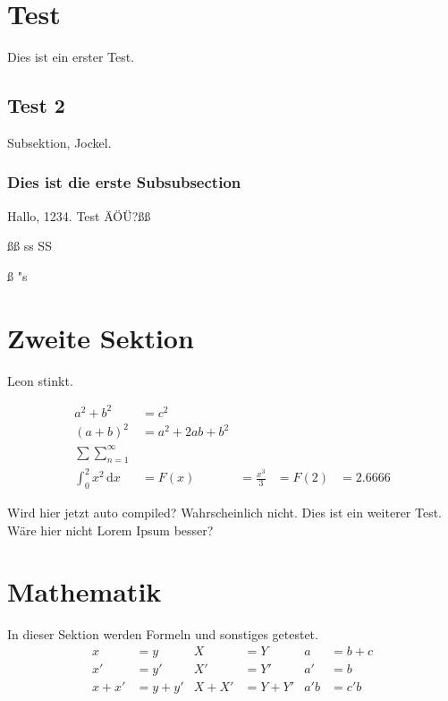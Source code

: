 \section{Test}
Dies ist ein erster Test.

\subsection{Test 2}
Subsektion, Jockel.

\subsubsection{Dies ist die erste Subsubsection}

Hallo, 1234. Test ÄÖÜ?ßß

ßß ss SS

ß
"s
\section{Zweite Sektion}
Leon stinkt.

\begin{align}
    a^2+b^2                        & =c^2                                               \\
    (a+b)^2                        & =a^2+2ab+b^2                                       \\
    \sum \sum_{n = 1}^{\infty}                                                          \\
    \int_{0}^{2} x^2 \,\mathrm{d}x & = F(x)       & = \frac{x^3}{3} & = F(2) & = 2.6666
\end{align}

Wird hier jetzt auto compiled? Wahrscheinlich nicht. Dies ist ein weiterer Test. Wäre hier nicht Lorem Ipsum besser?

\section{Mathematik}

In dieser Sektion werden Formeln und sonstiges getestet.
\\
\begin{align}
    \label{eq:C}
    x    & =y    & X    & =Y    & a   & =b+c \\
    \label{eq:D}
    x'   & =y'   & X'   & =Y'   & a'  & =b   \\
    \label{eq:F}
    x+x' & =y+y' & X+X' & =Y+Y' & a'b & =c'b
\end{align}

